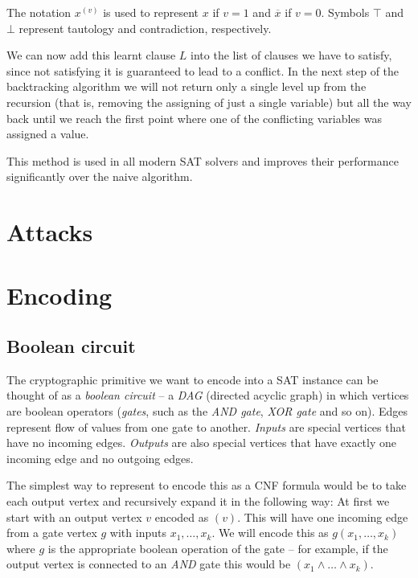 The notation $x^{(v)}$ is used to represent $x$ if $v=1$ and $\overline{x}$ if $v=0$. Symbols $\top$ and $\bot$ represent tautology and contradiction, respectively.

We can now add this learnt clause $L$ into the list of clauses we have to satisfy, since not satisfying it is guaranteed to lead to a conflict.
In the next step of the backtracking algorithm we will not return only a single level up from the recursion (that is, removing the assigning of just a single variable) but all the way back until we reach the first point where one of the conflicting variables was assigned a value.

This method is used in all modern SAT solvers and improves their performance significantly over the naive algorithm.


\chapter{Attacks}


\chapter{Encoding}


\section{Boolean circuit}
The cryptographic primitive we want to encode into a SAT instance can be thought of as a \emph{boolean circuit} -- a \emph{DAG} (directed acyclic graph) in which vertices are boolean operators (\emph{gates}, such as the \emph{AND gate}, \emph{XOR gate} and so on).
Edges represent flow of values from one gate to another.
\emph{Inputs} are special vertices that have no incoming edges.
\emph{Outputs} are also special vertices that have exactly one incoming edge and no outgoing edges.

The simplest way to represent to encode this as a CNF formula would be to take each output vertex and recursively expand it in the following way:
At first we start with an output vertex $v$ encoded as $(v)$.
This will have one incoming edge from a gate vertex $g$ with inputs $x_1, \dots, x_k$.
We will encode this as $g(x_1, \dots, x_k)$ where $g$ is the appropriate boolean operation of the gate -- for example, if the output vertex is connected to an \emph{AND} gate this would be $(x_1 \land \dots \land x_k)$.

